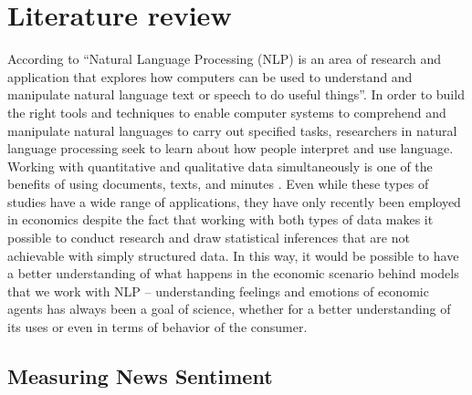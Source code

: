 \chapter{\textbf{Literature review}}  \label{chapter:lit}

According to \cite{chowdhury2003} ``Natural Language Processing (NLP) is an area of research and application that explores how computers can be used to understand and manipulate natural language text or speech to do useful things''. In order to build the right tools and techniques to enable computer systems to comprehend and manipulate natural languages to carry out specified tasks, researchers in natural language processing seek to learn about how people interpret and use language.\\

Working with quantitative and qualitative data simultaneously is one of the benefits of using documents, texts, and minutes \cite[p. 1]{bholat2015text}. Even while these types of studies have a wide range of applications, they have only recently been employed in economics despite the fact that working with both types of data makes it possible to conduct research and draw statistical inferences that are not achievable with simply structured data. In this way, it would be possible to have a better understanding of what happens in the economic scenario behind models that we work with NLP -- understanding feelings and emotions of economic agents has always been a goal of science, whether for a better understanding of its uses or even in terms of behavior of the consumer.\\

\section{Measuring News Sentiment}

